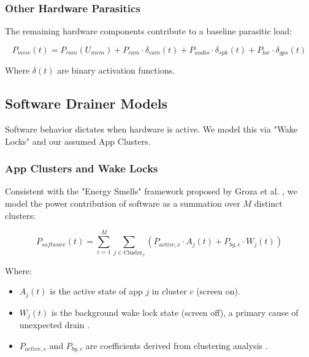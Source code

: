 \documentclass[12pt]{article}
\begin{document}

\subsubsection{Other Hardware Parasitics}

The remaining hardware components contribute to a baseline parasitic load:

\begin{equation}
P_{misc}(t) = P_{ram}(U_{mem}) + P_{cam} \cdot \delta_{cam}(t) + P_{audio} \cdot \delta_{spk}(t) + P_{loc} \cdot \delta_{gps}(t)
\end{equation}

Where $\delta(t)$ are binary activation functions.

\subsection{Software Drainer Models}

Software behavior dictates when hardware is active. We model this via "Wake Locks" and our assumed App Clusters.

\subsubsection{App Clusters and Wake Locks}

Consistent with the "Energy Smells" framework proposed by Groza et al. \cite{10}, we model the power contribution of software as a summation over $M$ distinct clusters:

\begin{equation}
P_{software}(t) = \sum_{c=1}^{M} \sum_{j \in \text{Cluster}_c} \left( P_{active,c} \cdot A_j(t) + P_{bg,c} \cdot W_j(t) \right)
\end{equation}

Where:
\begin{itemize}
    \item $A_j(t)$ is the active state of app $j$ in cluster $c$ (screen on).
    \item $W_j(t)$ is the background wake lock state (screen off), a primary cause of unexpected drain \cite{10}.
    \item $P_{active,c}$ and $P_{bg,c}$ are coefficients derived from clustering analysis \cite{12}.
\end{itemize}
\end{document}
